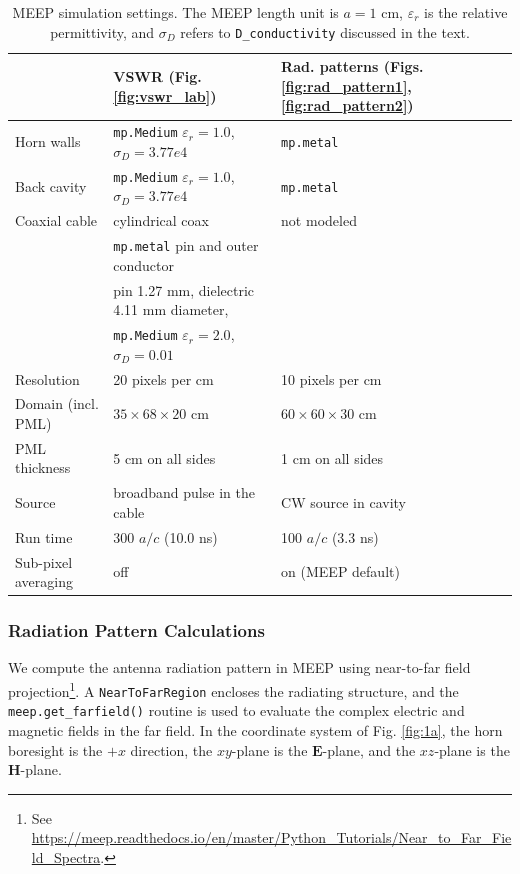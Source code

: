 \documentclass[electronics,article,submit,pdftex,moreauthors]{Definitions/mdpi}
\begin{document}
\begin{table}[ht]
\centering
\caption{\label{tab:meep_settings} MEEP simulation settings. The MEEP length unit is $a = 1$ cm, $\varepsilon_r$ is the relative permittivity, and $\sigma_D$ refers to \texttt{D\_conductivity} discussed in the text.}
\small
\begin{tabular}{lll}
\toprule
 & \textbf{VSWR (Fig. \ref{fig:vswr_lab})} & \textbf{Rad. patterns (Figs. \ref{fig:rad_pattern1}, \ref{fig:rad_pattern2})} \\
\midrule
Horn walls & \texttt{mp.Medium} $\varepsilon_r = 1.0$, $\sigma_D = 3.77e4$ & \texttt{mp.metal} \\
Back cavity & \texttt{mp.Medium} $\varepsilon_r = 1.0$, $\sigma_D = 3.77e4$ & \texttt{mp.metal} \\
Coaxial cable & cylindrical coax & not modeled \\
 & \texttt{mp.metal} pin and outer conductor \\
 & pin 1.27 mm, dielectric 4.11 mm diameter, \\
 & \texttt{mp.Medium} $\varepsilon_r = 2.0$, $\sigma_D = 0.01$ & \\
Resolution & 20 pixels per cm & 10 pixels per cm \\
Domain (incl. PML) & $35 \times 68 \times 20$ cm & $60 \times 60 \times 30$ cm \\
PML thickness & 5 cm on all sides & 1 cm on all sides \\
Source & broadband pulse in the cable & CW source in cavity \\
Run time & 300 $a/c$ (10.0 ns) & 100 $a/c$ (3.3 ns) \\
Sub-pixel averaging & off & on (MEEP default) \\
\bottomrule
\end{tabular}
\end{table}

\subsubsection{Radiation Pattern Calculations}

We compute the antenna radiation pattern in MEEP using near-to-far field projection\footnote{See \url{https://meep.readthedocs.io/en/master/Python_Tutorials/Near_to_Far_Field_Spectra}.}.  A \verb+NearToFarRegion+ encloses the radiating structure, and the \verb+meep.get_farfield()+ routine is used to evaluate the complex electric and magnetic fields in the far field.  In the coordinate system of Fig. \ref{fig:1a}, the horn boresight is the $+x$ direction, the $xy$-plane is the $\mathbf{E}$-plane, and the $xz$-plane is the $\mathbf{H}$-plane.
\end{document}

